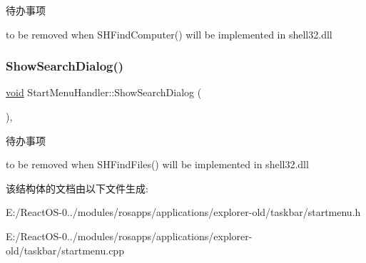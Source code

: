 \begin{DoxyRefDesc}{待办事项}
\item[\hyperlink{todo__todo000070}{待办事项}]to be removed when S\+H\+Find\+Computer() will be implemented in shell32.\+dll \end{DoxyRefDesc}
\mbox{\label{struct_start_menu_handler_ac06629f59aa85cbaf1b5adfbc62ff124}} 
\subsubsection{\texorpdfstring{Show\+Search\+Dialog()}{ShowSearchDialog()}}
{\footnotesize\ttfamily \hyperlink{interfacevoid}{void} Start\+Menu\+Handler\+::\+Show\+Search\+Dialog (\begin{DoxyParamCaption}{ }\end{DoxyParamCaption})\hspace{0.3cm}{\ttfamily [static]}, {\ttfamily [protected]}}

\begin{DoxyRefDesc}{待办事项}
\item[\hyperlink{todo__todo000069}{待办事项}]to be removed when S\+H\+Find\+Files() will be implemented in shell32.\+dll \end{DoxyRefDesc}


该结构体的文档由以下文件生成\+:\begin{DoxyCompactItemize}
\item 
E\+:/\+React\+O\+S-\/0../modules/rosapps/applications/explorer-\/old/taskbar/startmenu.\+h\item 
E\+:/\+React\+O\+S-\/0../modules/rosapps/applications/explorer-\/old/taskbar/startmenu.\+cpp\end{DoxyCompactItemize}
